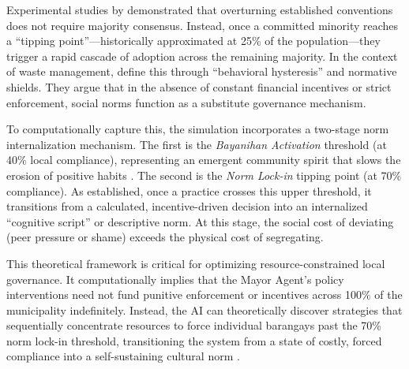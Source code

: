 Experimental studies by \citet{Centola2018} demonstrated that overturning established conventions does not require majority consensus. Instead, once a committed minority reaches a ``tipping point''—historically approximated at 25\% of the population—they trigger a rapid cascade of adoption across the remaining majority. In the context of waste management, \citet{Constantino2022} define this through ``behavioral hysteresis'' and normative shields. They argue that in the absence of constant financial incentives or strict enforcement, social norms function as a substitute governance mechanism. 

To computationally capture this, the simulation incorporates a two-stage norm internalization mechanism. The first is the \textit{Bayanihan Activation} threshold (at 40\% local compliance), representing an emergent community spirit that slows the erosion of positive habits \citep{Nishimura2022}. The second is the \textit{Norm Lock-in} tipping point (at 70\% compliance). As \citet{Corcoran2020} established, once a practice crosses this upper threshold, it transitions from a calculated, incentive-driven decision into an internalized ``cognitive script'' or descriptive norm. At this stage, the social cost of deviating (peer pressure or shame) exceeds the physical cost of segregating. 

This theoretical framework is critical for optimizing resource-constrained local governance. It computationally implies that the Mayor Agent's policy interventions need not fund punitive enforcement or incentives across 100\% of the municipality indefinitely. Instead, the AI can theoretically discover strategies that sequentially concentrate resources to force individual barangays past the 70\% norm lock-in threshold, transitioning the system from a state of costly, forced compliance into a self-sustaining cultural norm \citep{Farrow2020}.